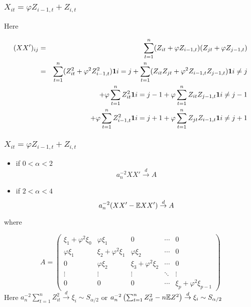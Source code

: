 \documentclass{beamer}
\begin{document}
\begin{frame}
  \frametitle{$X_{it} = \varphi Z_{i-1, t} + Z_{i,t}$}
  Here
  \begin{footnotesize}
    \begin{eqnarray*}
      (XX')_{ij} &=& \sum_{t=1}^n (Z_{it} + \varphi Z_{i-1,t})(Z_{jt} +
      \varphi Z_{j-1,t}) \\
      &=& \sum_{t=1}^n (Z_{it}^2 + \varphi^2 Z_{i-1,t}^2)\mathbf{1}{i=j}
      + \sum_{t=1}^n (Z_{it}Z_{jt}+\varphi^2 Z_{i-1,t}Z_{j-1,t})\mathbf{1}{i\neq j}
      \\
      && + \varphi \sum_{t=1}^n Z_{it}^2 \mathbf{1}{i=j-1} 
      +\varphi\sum_{t=1}^n Z_{it} Z_{j-1,t}\mathbf{1}{i\neq j-1} \\
      && + \varphi \sum_{t=1}^n Z_{i-1,t}^2 \mathbf{1}{i=j+1} 
      +\varphi\sum_{t=1}^n Z_{jt} Z_{i-1,t}\mathbf{1}{i\neq j+1} \\
    \end{eqnarray*}
  \end{footnotesize}
\end{frame}

\begin{frame}
  \frametitle{$X_{it} = \varphi Z_{i-1, t} + Z_{i,t}$}
  \begin{itemize}
  \item if $0 < \alpha < 2$
    \[
    a_n^{-2} XX' \overset{d}{\to} A
    \]
  \item if $2 < \alpha < 4$
    \[
    a_n^{-2} (XX' - \mathbb{E} XX' ) \overset{d}{\to} A
    \]
  \end{itemize}
  where
  \begin{footnotesize}
    \[
    A =
    \begin{pmatrix}
      \xi_1 + \varphi^2 \xi_0 & \varphi \xi_1 & 0 & \cdots & 0 \\
      \varphi \xi_1 & \xi_2 + \varphi^2 \xi_1 & \varphi \xi_2 & \cdots & 0 \\
      0 & \varphi \xi_2 & \xi_3 + \varphi^2 \xi_2 & \cdots & 0 \\
      \vdots & \vdots & \vdots & \ddots & \vdots \\
      0 & 0 & 0 & \cdots & \xi_p + \varphi^2 \xi_{p-1}
    \end{pmatrix}
    \]
    Here $a_n^{-2}\sum_{t=1}^n Z_{it}^2 \overset{d}{\to} \xi_i \sim
    S_{\alpha/2}$ or $a_n^{-2}\left(\sum_{t=1}^n Z_{it}^2 - n \mathbb{E}
      Z^2\right) \overset{d}{\to} \xi_i \sim S_{\alpha/2}$
  \end{footnotesize}
\end{frame}
\end{document}
